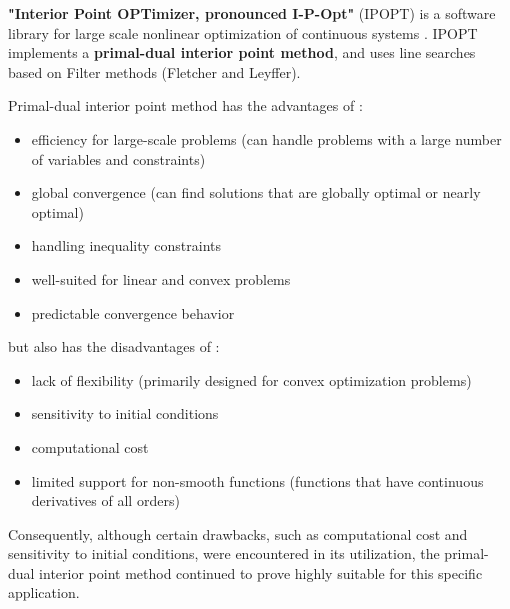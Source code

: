 \textbf{"Interior Point OPTimizer, pronounced I-P-Opt"} (IPOPT) is a software library for large scale nonlinear optimization of continuous systems \cite{ipopt}. IPOPT implements a \textbf{primal-dual interior point method}, and uses line searches based on Filter methods (Fletcher and Leyffer).

Primal-dual interior point method has the advantages of :
\begin{itemize}
    \item efficiency for large-scale problems (can handle problems with a large number of variables and constraints)
    \item global convergence (can find solutions that are globally optimal or nearly optimal) 
    \item handling inequality constraints
    \item well-suited for linear and convex problems
    \item predictable convergence behavior
\end{itemize}

but also has the disadvantages of :
\begin{itemize}
    \item lack of flexibility (primarily designed for convex optimization problems)
    \item sensitivity to initial conditions
    \item computational cost
    \item limited support for non-smooth functions (functions that have continuous derivatives of all orders)
\end{itemize}

Consequently, although certain drawbacks, such as computational cost and sensitivity to initial conditions, were encountered in its utilization, the primal-dual interior point method continued to prove highly suitable for this specific application.




